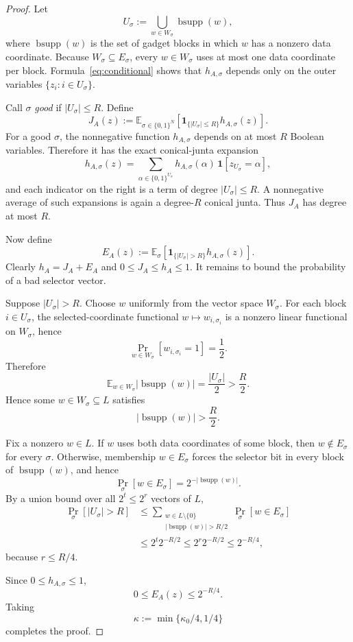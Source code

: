 \documentclass[11pt]{article}
\theoremstyle{definition}
\newcommand{\bits}{\{0,1\}}
\newcommand{\bsupp}{\operatorname{bsupp}}
\newcommand{\E}{\mathbb E}
\newcommand{\Prb}{\mathop{\Pr}}
\begin{document}
\begin{proof}
Let
\[
  U_\sigma
  :=
  \bigcup_{w\in W_\sigma}\bsupp(w),
  \tag{4.8}\label{eq:Usigma}
\]
where $\bsupp(w)$ is the set of gadget blocks in which $w$ has a nonzero data
coordinate.
Because $W_\sigma\subseteq E_\sigma$, every $w\in W_\sigma$ uses at most one data
coordinate per block.  Formula~\eqref{eq:conditional} shows that
$h_{A,\sigma}$ depends only on the outer variables $\{z_i:i\in U_\sigma\}$.

Call $\sigma$ \emph{good} if $|U_\sigma|\le R$.
Define
\[
  J_A(z)
  :=
  \E_{\sigma\in\bits^N}
  \left[
    \mathbf1_{\{|U_\sigma|\le R\}}h_{A,\sigma}(z)
  \right].
  \tag{4.9}\label{eq:JA}
\]
For a good $\sigma$, the nonnegative function $h_{A,\sigma}$ depends on at most $R$
Boolean variables.  Therefore it has the exact conical-junta expansion
\[
  h_{A,\sigma}(z)
  =
  \sum_{\alpha\in\bits^{U_\sigma}}
  h_{A,\sigma}(\alpha)\,
  \mathbf1[z_{U_\sigma}=\alpha],
  \tag{4.10}\label{eq:truth-table-conical}
\]
and each indicator on the right is a term of degree $|U_\sigma|\le R$.
A nonnegative average of such expansions is again a degree-$R$ conical junta.
Thus $J_A$ has degree at most $R$.

Now define
\[
  E_A(z)
  :=
  \E_\sigma
  \left[
    \mathbf1_{\{|U_\sigma|>R\}}h_{A,\sigma}(z)
  \right].
  \tag{4.11}\label{eq:EA}
\]
Clearly $h_A=J_A+E_A$ and $0\le J_A\le h_A\le1$.
It remains to bound the probability of a bad selector vector.

Suppose $|U_\sigma|>R$.
Choose $w$ uniformly from the vector space $W_\sigma$.
For each block $i\in U_\sigma$, the selected-coordinate functional
$w\mapsto w_{i,\sigma_i}$ is a nonzero linear functional on $W_\sigma$, hence
\[
  \Prb_{w\in W_\sigma}[w_{i,\sigma_i}=1]=\frac12.
\]
Therefore
\[
  \E_{w\in W_\sigma}|\bsupp(w)|
  =
  \frac{|U_\sigma|}{2}
  >
  \frac R2.
\]
Hence some $w\in W_\sigma\subseteq L$ satisfies
\[
  |\bsupp(w)|>\frac R2.
  \tag{4.12}\label{eq:bigw}
\]

Fix a nonzero $w\in L$.
If $w$ uses both data coordinates of some block, then $w\notin E_\sigma$ for every
$\sigma$.
Otherwise, membership $w\in E_\sigma$ forces the selector bit in every block of
$\bsupp(w)$, and hence
\[
  \Prb_\sigma[w\in E_\sigma]
  =
  2^{-|\bsupp(w)|}.
  \tag{4.13}\label{eq:wprob}
\]
By a union bound over all $2^t\le2^r$ vectors of $L$,
\[
\begin{aligned}
  \Prb_\sigma[|U_\sigma|>R]
  &\le
  \sum_{\substack{w\in L\setminus\{0\}\\|\bsupp(w)|>R/2}}
  \Prb_\sigma[w\in E_\sigma]
\\
  &\le
  2^t2^{-R/2}
  \le
  2^r2^{-R/2}
  \le
  2^{-R/4},
\end{aligned}
\tag{4.14}\label{eq:badselector}
\]
because $r\le R/4$.

Since $0\le h_{A,\sigma}\le1$,
\[
  0\le E_A(z)\le2^{-R/4}.
\]
Taking
\[
  \kappa:=\min\{\kappa_0/4,1/4\}
\]
completes the proof.
\end{proof}
\end{document}
